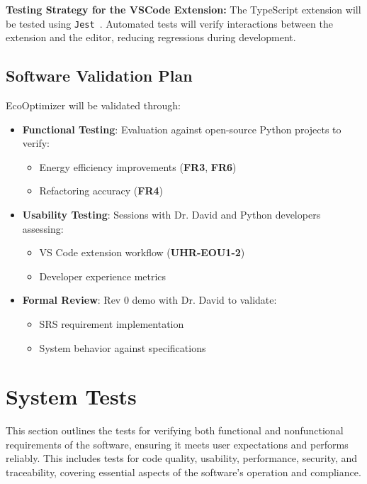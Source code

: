 \documentclass[12pt, titlepage]{article}
\begin{document}
\noindent\textbf{Testing Strategy for the VSCode Extension:} The
TypeScript extension will be tested using \texttt{Jest}~\cite{jest}.
Automated tests will verify interactions between the extension and
the editor, reducing regressions during development.

\subsection{Software Validation Plan}

EcoOptimizer will be validated through:
\begin{itemize}
    \item \textbf{Functional Testing}: Evaluation against open-source Python projects to verify:
    \begin{itemize}
        \item Energy efficiency improvements (\textbf{FR3}, \textbf{FR6})
        \item Refactoring accuracy (\textbf{FR4})
    \end{itemize}
    
    \item \textbf{Usability Testing}: Sessions with Dr. David and Python developers assessing:
    \begin{itemize}
        \item VS Code extension workflow (\textbf{UHR-EOU1-2})
        \item Developer experience metrics
    \end{itemize}
    
    \item \textbf{Formal Review}: Rev 0 demo with Dr. David to validate:
    \begin{itemize}
        \item SRS requirement implementation
        \item System behavior against specifications
    \end{itemize}
\end{itemize}

\newpage\section{System Tests}

This section outlines the tests for verifying both functional and
nonfunctional requirements of the software, ensuring it meets user
expectations and performs reliably. This includes tests for code
quality, usability, performance, security, and traceability, covering
essential aspects of the software’s operation and compliance.
\end{document}
